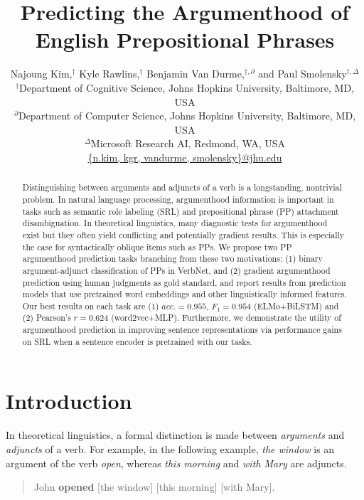 \documentclass[letterpaper]{article} %
\title{Predicting the Argumenthood of English Prepositional Phrases}
\author{Najoung Kim,$^\dagger$ Kyle Rawlins,$^\dagger$ Benjamin Van Durme,$^{\dagger,\partial}$ and Paul Smolensky$^{\dagger,\Delta}$\\
$^\dagger$Department of Cognitive Science, Johns Hopkins University, Baltimore, MD, USA\\ 
$^\partial$Department of Computer Science, Johns Hopkins University, Baltimore, MD, USA \\
$^\Delta$Microsoft Research AI, Redmond, WA, USA\\
\url{{n.kim, kgr, vandurme, smolensky}@jhu.edu}}
\begin{document}
\maketitle
\begin{abstract}
Distinguishing between arguments and adjuncts of a verb is a longstanding, nontrivial problem. In natural language processing, argumenthood information is important in tasks such as semantic role labeling (SRL) and prepositional phrase (PP) attachment disambiguation. In theoretical linguistics, many diagnostic tests for argumenthood exist but they often yield conflicting and potentially gradient results. This is especially the case for syntactically oblique items such as PPs. We propose two PP argumenthood prediction tasks branching from these two motivations: (1) binary argument-adjunct classification of PPs in VerbNet, and (2) gradient argumenthood prediction using human judgments as gold standard, and report results from prediction models that use pretrained word embeddings and other linguistically informed features. Our best results on each task are (1) $acc.=0.955$, $F_1=0.954$ (ELMo+BiLSTM) and (2) Pearson's $r=0.624$ (word2vec+MLP). Furthermore, we demonstrate the utility of argumenthood prediction in improving sentence representations via performance gains on SRL when a sentence encoder is pretrained with our tasks.
\end{abstract}

\section{Introduction}

In theoretical linguistics, a formal distinction is made between \textit{arguments} and \textit{adjuncts} of a verb. For example, in the following example, \textit{the window} is an argument of the verb \textit{open}, whereas \textit{this morning} and \textit{with Mary} are adjuncts.

\begin{quote}
	John \textbf{opened} [the window] [this morning] [with Mary].
\end{quote}
\end{document}

